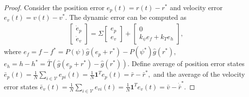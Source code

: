 \begin{proof}
Consider the position error $e_p(t)=r(t)-r^*$  and velocity error $e_v(t)=v(t)-v^*$. The dynamic error can be computed as
\begin{align}\label{eq:lct_errordoubleint}
\begin{bmatrix}
\dot{e}_p\\
\dot{e}_v
\end{bmatrix}
= 
\Sigma
\begin{bmatrix}
e_p\\
e_v
\end{bmatrix}
+
\begin{bmatrix}
0 \\
k_{\psi}e_f+k_Te_h
\end{bmatrix},
\end{align}
where 
$e_f=f-f^*=P(\psi)\hat{g}(e_p+r^*)-P(\psi^*)\hat{g}(r^*)$,
$e_h=h-h^*=\bar{T}\left(\hat{g}(e_p+r^*)-\hat{g}(r^*)\right)$.  
Define average of position error states
$
\bar{e}_p(t)=\frac{1}{N}\sum_{i \in \mathcal{V}}e_{pi}(t)=\frac{1}{N} \boldsymbol{1}^Te_p(t) =\bar{r}-\bar{r}^*,
$
and the average of the velocity error states
$
\bar{e}_v(t)=\frac{1}{N}\sum_{i \in \mathcal{V}}e_{vi}(t)=\frac{1}{N} \boldsymbol{1}^Te_v(t)= \bar{v}-\dot{\bar{r}}^*.
$
%

\end{proof}
